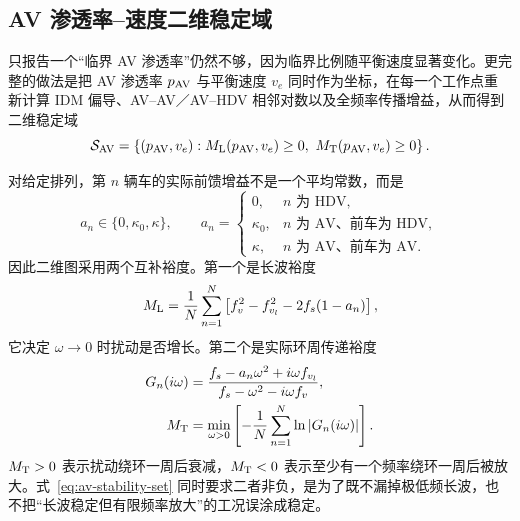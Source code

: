 \documentclass[11pt,a4paper,openany]{book}
\numberwithin{equation}{chapter}
\numberwithin{figure}{chapter}
\numberwithin{table}{chapter}
\begin{document}
\subsection{AV 渗透率--速度二维稳定域}
\label{sub:av-plane}

只报告一个“临界 AV 渗透率”仍然不够，因为临界比例随平衡速度显著变化。更完整的做法是把 AV 渗透率 $p_{\rm AV}$ 与平衡速度 $v_e$ 同时作为坐标，在每一个工作点重新计算 IDM 偏导、AV--AV／AV--HDV 相邻对数以及全频率传播增益，从而得到二维稳定域
\begin{equation}
\mathcal S_{\rm AV}
=\left\{(p_{\rm AV},v_e):M_{\rm L}(p_{\rm AV},v_e)\ge0,
\ M_{\rm T}(p_{\rm AV},v_e)\ge0\right\}.
\label{eq:av-stability-set}
\end{equation}

对给定排列，第 $n$ 辆车的实际前馈增益不是一个平均常数，而是
\begin{equation}
a_n\in\{0,\kappa_0,\kappa\},
\qquad
a_n=
\begin{cases}
0, & n\text{ 为 HDV},\\
\kappa_0, & n\text{ 为 AV、前车为 HDV},\\
\kappa, & n\text{ 为 AV、前车为 AV}.
\end{cases}
\label{eq:av-pair-gain}
\end{equation}
因此二维图采用两个互补裕度。第一个是长波裕度
\begin{equation}
M_{\rm L}
=\frac1N\sum_{n=1}^{N}
\left[f_v^2-f_{v_l}^2-2f_s(1-a_n)\right],
\label{eq:av-long-margin}
\end{equation}
它决定 $\omega\to0$ 时扰动是否增长。第二个是实际环周传递裕度
\begin{align}
G_n(i\omega)
&=\frac{f_s-a_n\omega^2+i\omega f_{v_l}}
{f_s-\omega^2-i\omega f_v},\\
M_{\rm T}
&=\min_{\omega>0}
\left[-\frac1N\sum_{n=1}^{N}\ln|G_n(i\omega)|\right].
\label{eq:av-transfer-margin}
\end{align}
$M_{\rm T}>0$ 表示扰动绕环一周后衰减，$M_{\rm T}<0$ 表示至少有一个频率绕环一周后被放大。式~\eqref{eq:av-stability-set} 同时要求二者非负，是为了既不漏掉极低频长波，也不把“长波稳定但有限频率放大”的工况误涂成稳定。
\end{document}
